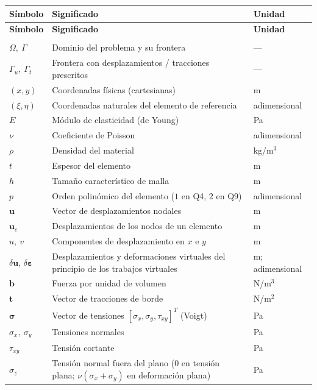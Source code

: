 \renewcommand{\arraystretch}{1.2}
\begin{longtable}{@{}>{\raggedright\arraybackslash}p{3.0cm}p{7.8cm}p{3.0cm}@{}}
\toprule
\textbf{Símbolo} & \textbf{Significado} & \textbf{Unidad} \\
\midrule
\endfirsthead
\toprule
\textbf{Símbolo} & \textbf{Significado} & \textbf{Unidad} \\
\midrule
\endhead
\bottomrule
\endfoot
\multicolumn{3}{@{}l}{\textit{Dominio, material y campos}} \\
\addlinespace
$\Omega,\ \Gamma$ & Dominio del problema y su frontera & --- \\
$\Gamma_u,\ \Gamma_t$ & Frontera con desplazamientos / tracciones prescritos & --- \\
$(x,y)$ & Coordenadas físicas (cartesianas) & m \\
$(\xi,\eta)$ & Coordenadas naturales del elemento de referencia & adimensional \\
$E$ & Módulo de elasticidad (de Young) & Pa \\
$\nu$ & Coeficiente de Poisson & adimensional \\
$\rho$ & Densidad del material & kg/m$^3$ \\
$t$ & Espesor del elemento & m \\
$h$ & Tamaño característico de malla & m \\
$p$ & Orden polinómico del elemento ($1$ en Q4, $2$ en Q9) & adimensional \\
$\bm{u}$ & Vector de desplazamientos nodales & m \\
$\bm{u}_e$ & Desplazamientos de los nodos de un elemento & m \\
$u,\ v$ & Componentes de desplazamiento en $x$ e $y$ & m \\
$\delta\bm{u}$, $\delta\bm{\varepsilon}$ & Desplazamientos y deformaciones virtuales del principio de los trabajos virtuales & m; adimensional \\
$\bm{b}$ & Fuerza por unidad de volumen & N/m$^3$ \\
$\bm{t}$ & Vector de tracciones de borde & N/m$^2$ \\
$\bm{\sigma}$ & Vector de tensiones $[\sigma_x,\sigma_y,\tau_{xy}]^T$ (Voigt) & Pa \\
$\sigma_x,\ \sigma_y$ & Tensiones normales & Pa \\
$\tau_{xy}$ & Tensión cortante & Pa \\
$\sigma_z$ & Tensión normal fuera del plano ($0$ en tensión plana; $\nu(\sigma_x+\sigma_y)$ en deformación plana) & Pa \\

\end{longtable}
